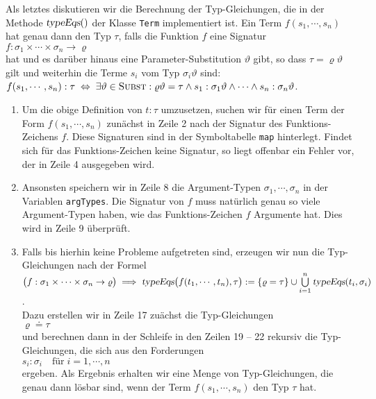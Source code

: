 Als letztes diskutieren wir die Berechnung der Typ-Gleichungen, die in der Methode $\textsl{typeEqs}()$ der
Klasse \texttt{Term} implementiert ist.  
Ein Term $f(s_1, \cdots, s_n)$ hat genau dann den Typ $\tau$, falls die Funktion $f$
eine Signatur
\\[0.2cm]
\hspace*{1.3cm}
$f: \sigma_1 \times \cdots \times \sigma_n \rightarrow \varrho$
\\[0.2cm]
hat und es dar\"uber hinaus eine Parameter-Substitution $\vartheta$ gibt, so dass
$\tau = \varrho\vartheta$ gilt und weiterhin die Terme $s_i$ vom Typ $\sigma_i\vartheta$ sind:
\\[0.2cm]
\hspace*{1.3cm}
$f(s_1,\cdots,s_n):\tau \;\Leftrightarrow\; 
 \exists \vartheta\in\textsc{Subst}: \varrho\vartheta = \tau \wedge 
 s_1:\sigma_1\vartheta \wedge \cdots \wedge s_n:\sigma_n\vartheta$.
\begin{enumerate}
\item Um die obige Definition von $t:\tau$ umzusetzen, suchen wir f\"ur einen Term der Form
      $f(s_1,\cdots,s_n)$ zun\"achst in Zeile 2 nach der Signatur des Funktions-Zeichens $f$.
      Diese Signaturen sind in der Symboltabelle \texttt{map} hinterlegt.
      Findet sich f\"ur das Funktions-Zeichen keine Signatur, so liegt offenbar ein Fehler vor, 
      der in Zeile 4 ausgegeben wird.
\item Ansonsten speichern wir in Zeile 8 die Argument-Typen $\sigma_1, \cdots, \sigma_n$ in der Variablen
      \texttt{argTypes}.  Die Signatur von $f$ muss nat\"urlich genau so viele Argument-Typen
      haben, wie das Funktions-Zeichen $f$ Argumente hat.  Dies wird in Zeile  9 \"uberpr\"uft.
\item Falls bis hierhin keine Probleme aufgetreten sind, erzeugen wir nun die Typ-Gleichungen nach der Formel
      \\[0.2cm]
      \hspace*{1.3cm}
      $\bigl(f: \sigma_1 \times \cdots \times \sigma_n \rightarrow \varrho\bigr) \;\Longrightarrow\;
      \textsl{typeEqs}\bigl( f(t_1,\cdots,t_n), \tau \bigr) := 
      \{ \varrho = \tau \} \cup \bigcup\limits_{i=1}^n \textsl{typeEqs}(t_i, \sigma_i)$.
      \\[0.2cm]
      Dazu erstellen wir in Zeile 17 zu\"achst die Typ-Gleichungen
      \\[0.2cm]      
      \hspace*{1.3cm}
      $\varrho \doteq \tau$
      \\[0.2cm]
      und berechnen dann in der Schleife in den Zeilen 19 -- 22 rekursiv die Typ-Gleichungen, die sich aus
      den Forderungen 
      \\[0.2cm]
      \hspace*{1.3cm}
      $s_i:\sigma_i \quad \mbox{f\"ur} \; i=1,\cdots,n$
      \\[0.2cm]
      ergeben.  Als Ergebnis erhalten wir eine Menge von Typ-Gleichungen, die genau
      dann l\"osbar sind, wenn der Term $f(s_1,\cdots,s_n)$ den Typ $\tau$ hat.
\end{enumerate}


